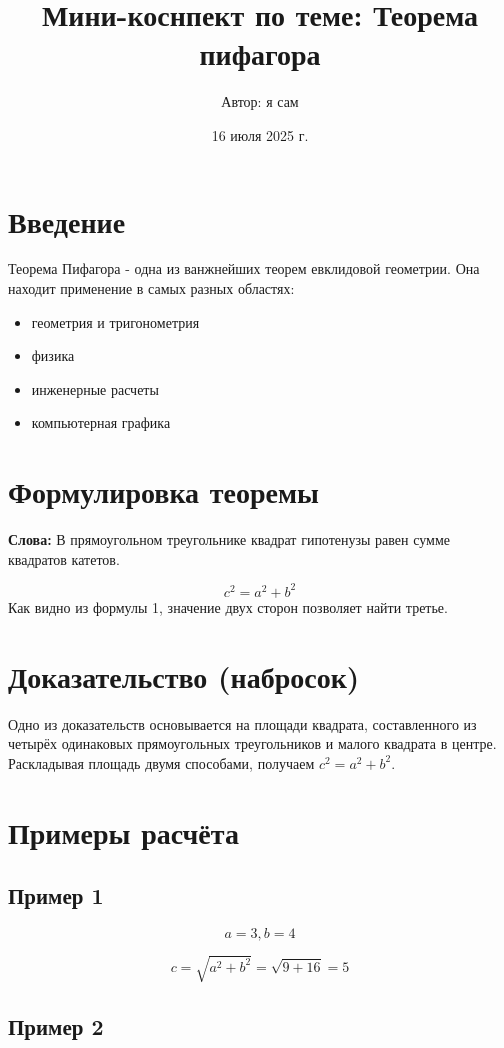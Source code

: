 \documentclass{article}
\title{Мини-коснпект по теме: Теорема пифагора}
\author{Автор: я сам}
\date{16 июля 2025 г.}
\begin{document}
\maketitle

\tableofcontents
\newpage
\section{Введение}
Теорема Пифагора - одна из ванжнейших теорем евклидовой геометрии. Она находит
применение в самых разных областях:
\begin{itemize}
    \item геометрия и тригонометрия
    \item физика
    \item инженерные расчеты
    \item компьютерная графика
\end{itemize}
\section{Формулировка теоремы}
\textbf{Слова:}
В прямоугольном треугольнике квадрат гипотенузы равен сумме квадратов катетов.
\\
\begin{center}
    \begin{equation}
        c^2 = a^2+b^2
    \end{equation}
    Как видно из формулы 1, значение двух сторон позволяет найти третье.
\end{center}
\section{Доказательство (набросок)}
Одно из доказательств основывается на площади квадрата, составленного
из четырёх одинаковых прямоугольных треугольников и малого квадрата
в центре. Раскладывая площадь двумя способами, получаем $c^2 = a^2+b^2$.
\section{Примеры расчёта}

\subsection*{Пример 1}

\[
a = 3, b = 4
\]

\[
c = \sqrt{a^2 + b^2}
  = \sqrt{9 + 16}
  = 5
\]

\subsection*{Пример 2}
\end{document}

